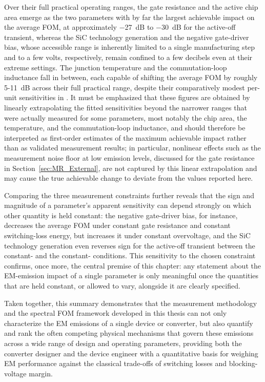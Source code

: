 Over their full practical operating ranges, the gate resistance and the active chip area emerge as the two parameters with by far the largest achievable impact on the average FOM, at approximately \SI{-27}{dB} to \SI{-30}{dB} for the active-off transient, whereas the SiC technology generation and the negative gate-driver bias, whose accessible range is inherently limited to a single manufacturing step and to a few volts, respectively, remain confined to a few decibels even at their extreme settings.
The junction temperature and the commutation-loop inductance fall in between, each capable of shifting the average FOM by roughly \SI{5}{}-\SI{11}{dB} across their full practical range, despite their comparatively modest per-unit sensitivities in .
It must be emphasized that these figures are obtained by linearly extrapolating the fitted sensitivities beyond the narrower ranges that were actually measured for some parameters, most notably the chip area, the temperature, and the commutation-loop inductance, and should therefore be interpreted as first-order estimates of the maximum achievable impact rather than as validated measurement results; in particular, nonlinear effects such as the measurement noise floor at low emission levels, discussed for the gate resistance in Section~\ref{sec:MR_External}, are not captured by this linear extrapolation and may cause the true achievable change to deviate from the values reported here.

Comparing the three measurement constraints further reveals that the sign and magnitude of a parameter's apparent sensitivity can depend strongly on which other quantity is held constant: the negative gate-driver bias, for instance, decreases the average FOM under constant gate resistance and constant switching-loss energy, but increases it under constant overvoltage, and the SiC technology generation even reverses sign for the active-off transient between the constant- and the constant- conditions.
This sensitivity to the chosen constraint confirms, once more, the central premise of this chapter: any statement about the EM-emission impact of a single parameter is only meaningful once the quantities that are held constant, or allowed to vary, alongside it are clearly specified.

Taken together, this summary demonstrates that the measurement methodology and the spectral FOM framework developed in this thesis can not only characterize the EM emissions of a single device or converter, but also quantify and rank the often competing physical mechanisms that govern these emissions across a wide range of design and operating parameters, providing both the converter designer and the device engineer with a quantitative basis for weighing EM performance against the classical trade-offs of switching losses and blocking-voltage margin.

